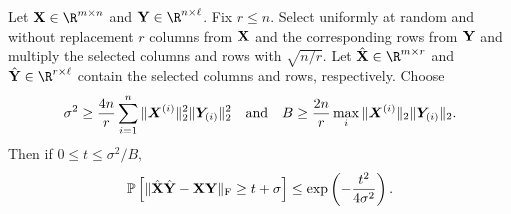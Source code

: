 \begin{lemma}
\label{lemma:matrix-multiplication}
Let $\matX \in \R^{m \times n}$ and $\matY \in \R^{n \times \ell}$. Fix $r \leq n$. Select uniformly at random and without replacement $r$ columns from ${\bm{\mathrm{X}}}$ and the corresponding rows from ${\bm{\mathrm{Y}}}$ and multiply the selected columns and rows with $\sqrt{n/r}$. Let $\hat{\matX} \in \R^{m \times r}$ and $\hat{\matY} \in \R^{r \times \ell}$ contain the selected columns and rows, respectively.
Choose
\[
\sigma^2 \geq {4 n\over r} \sum_{i=1}^n \mbox{}\|\bm{X}^{(i)}\|_2^2 \mbox{}\|\bm{Y}_{(i)}\|_2^2 \quad \text{and} \quad B \geq {2 n\over r} \max_i \mbox{}\|\bm{X}^{(i)}\|_2 \mbox{}\|\bm{Y}_{(i)}\|_2.
\]
Then if $ 0 \leq t \leq \sigma^2/B,$
\[
\mbox{}{\mathbb{P}}\left[\mbox{}\|\hat{{\bm{\mathrm{X}}}} \hat{{\bm{\mathrm{Y}}}} - {\bm{\mathrm{X}}} {\bm{\mathrm{Y}}}\|_\mathrm{F} \geq t + \sigma \right] \leq \mathrm{exp}\left( -{t^2\over 4\sigma^2}\right).
\]
\end{lemma}
